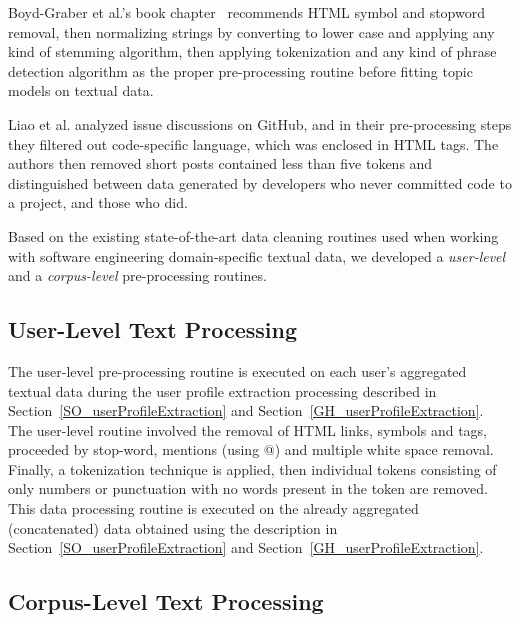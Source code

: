     Boyd-Graber et al.'s book chapter~\cite{boyd2014care} recommends HTML symbol and stopword removal, then normalizing strings by converting to lower case and applying any kind of stemming algorithm, then applying tokenization and any kind of phrase detection algorithm as the proper pre-processing routine before fitting topic models on textual data.
    
    Liao et al. \cite{liao2019status} analyzed issue discussions on GitHub, and in their pre-processing steps they filtered out code-specific language, which was enclosed in HTML tags. The authors then removed short posts contained less than five tokens and distinguished between data generated by developers who never committed code to a project, and those who did. 
    
    Based on the existing state-of-the-art data cleaning routines used when working with software engineering domain-specific textual data, we developed a \emph{user-level} and a \emph{corpus-level} pre-processing routines. 
    
    \subsection{User-Level Text Processing}
    
        The user-level pre-processing routine is executed on each user's aggregated textual data during the user profile extraction processing described in Section~\ref{SO_userProfileExtraction} and Section~\ref{GH_userProfileExtraction}. The user-level routine involved the removal of HTML links, symbols and tags, proceeded by stop-word, mentions (using @) and multiple white space removal. Finally, a tokenization technique is applied, then individual tokens consisting of only numbers or punctuation with no words present in the token are removed. This data processing routine is executed on the already aggregated (concatenated) data obtained using the description in Section~\ref{SO_userProfileExtraction} and Section~\ref{GH_userProfileExtraction}.
        
    \subsection{Corpus-Level Text Processing}
    

